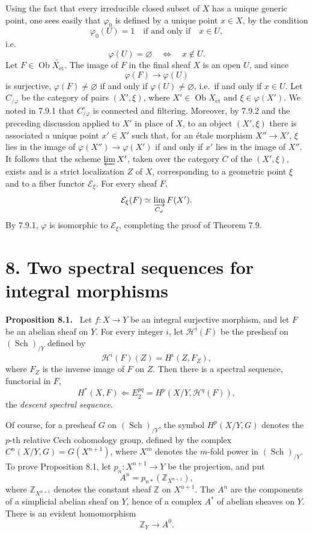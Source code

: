 \documentclass[11pt]{article}
\newcommand{\Hh}{\mathcal{H}}
\newcommand{\Zz}{\mathbb{Z}}
\newcommand{\Sch}{\operatorname{Sch}}
\newcommand{\Ob}{\operatorname{Ob}}
\newcommand{\et}{\mathrm{\acute{e}t}}
\newcommand{\ie}{i.e.\ }
\newenvironment{statement}[1]{\par\medskip\noindent\textbf{#1.}\ }{\par\medskip}
\begin{document}
Using the fact that every irreducible closed subset of \(X\) has a unique generic point, one sees easily that \(\varphi_0\) is defined by a unique point \(x\in X\), by the condition
\[
\varphi_0(U)=1\quad\text{if and only if}\quad x\in U,
\]
\ie
\[
\varphi(U)=\varnothing\quad\Longleftrightarrow\quad x\notin U.
\]
Let \(F\in\Ob\widetilde{X_{\et}}\). The image of \(F\) in the final sheaf \(X\) is an open \(U\), and since
\[
\varphi(F)\longrightarrow\varphi(U)
\]
is surjective, \(\varphi(F)\ne\varnothing\) if and only if \(\varphi(U)\ne\varnothing\), \ie if and only if \(x\in U\). Let \(C_{/\varphi}\) be the category of pairs \((X',\xi)\), where \(X'\in\Ob X_{\et}\) and \(\xi\in\varphi(X')\). We noted in 7.9.1 that \(C_{/\varphi}^\circ\) is connected and filtering. Moreover, by 7.9.2 and the preceding discussion applied to \(X'\) in place of \(X\), to an object \((X',\xi)\) there is associated a unique point \(x'\in X'\) such that, for an \'etale morphism \(X''\to X'\), \(\xi\) lies in the image of \(\varphi(X'')\to\varphi(X')\) if and only if \(x'\) lies in the image of \(X''\). It follows that the scheme \(\varprojlim X'\), taken over the category \(C\) of the \((X',\xi)\), exists and is a strict localization \(Z\) of \(X\), corresponding to a geometric point \(\xi\) and to a fiber functor \(\mathcal E_\xi\). For every sheaf \(F\),
\[
\mathcal E_\xi(F)\simeq \varinjlim_{C_\varphi}F(X').
\]
By 7.9.1, \(\varphi\) is isomorphic to \(\mathcal E_\xi\), completing the proof of Theorem 7.9.

\section*{8. Two spectral sequences for integral morphisms}

\begin{statement}{Proposition 8.1}
Let \(f:X\to Y\) be an integral surjective morphism, and let \(F\) be an abelian sheaf on \(Y\). For every integer \(i\), let \(\Hh^i(F)\) be the presheaf on \((\Sch)_{/Y}\) defined by
\[
\Hh^i(F)(Z)=H^i(Z,F_Z),
\]
where \(F_Z\) is the inverse image of \(F\) on \(Z\). Then there is a spectral sequence, functorial in \(F\),
\[
H^*(X,F)\Longleftarrow E_2^{pq}=H^p(X/Y,\Hh^q(F)),
\]
the \emph{descent spectral sequence}.
\end{statement}

Of course, for a presheaf \(G\) on \((\Sch)_{/Y}\), the symbol \(H^p(X/Y,G)\) denotes the \(p\)-th relative Cech cohomology group, defined by the complex \(C^n(X/Y,G)=G(X^{n+1})\), where \(X^m\) denotes the \(m\)-fold power in \((\Sch)_{/Y}\). To prove Proposition 8.1, let \(p_n:X^{n+1}\to Y\) be the projection, and put
\[
A^n=p_{n*}(\Zz_{X^{n+1}}),
\]
where \(\Zz_{X^{n+1}}\) denotes the constant sheaf \(\Zz\) on \(X^{n+1}\). The \(A^n\) are the components of a simplicial abelian sheaf on \(Y\), hence of a complex \(A^*\) of abelian sheaves on \(Y\). There is an evident homomorphism
\[
\Zz_Y\longrightarrow A^0.
\tag{*}
\]
\end{document}
